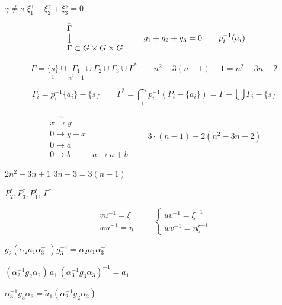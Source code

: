 \documentclass[11pt,a4paper]{article}
\begin{document}
$\gamma \neq s$ \qquad $\xi_1^\gamma + \xi_2^\gamma + \xi_3^\gamma = 0$ \qquad {}

\[
\begin{array}{l}
\tilde\Gamma \\
\big\downarrow \\
\Gamma \subset G \times G \times G
\end{array}
\qquad
g_1 + g_2 + g_3 = 0
\qquad
p_i^{-1}(a_i)
\]

\[
\Gamma = \underset{1}{\lbrace s \rbrace} \cup \underset{n^2 - 1}{\Gamma_1} \cup \Gamma_2 \cup \Gamma_3 \cup \Gamma^{*}
\qquad
n^2 - 3(n-1) - 1 = n^2 - 3n + 2
\]

\[
\Gamma_i = p_i^{-1}\lbrace a_i \rbrace - \lbrace s \rbrace
\qquad
\Gamma^{*} = \bigcap_i p_i^{-1}(P_i - \lbrace a_i \rbrace) = \Gamma - \bigcup \Gamma_i - \lbrace s \rbrace
\]

\[
\begin{array}{ll}
x \xrightarrow{\ \sim\ } y & \\
0 \to y - x & \\
0 \to a & \\
0 \to b & a \to a + b
\end{array}
\qquad
\boxed{3 \cdot (n-1) + 2(n^2 - 3n + 2)}
\]

$2n^2 - 3n + 1$ \qquad $3n - 3 = 3(n - 1)$

$P_2^{*}, P_3^{*}, P_1^{*}$, \quad $\Gamma^{*}$

\[
\begin{array}{l}
v u^{-1} = \xi \\
w u^{-1} = \eta
\end{array}
\qquad
\left\lbrace
\begin{array}{l}
u v^{-1} = \xi^{-1} \\
w v^{-1} = \eta \xi^{-1}
\end{array}
\right.
\]

$g_2 (\alpha_2 a_1 \alpha_3^{-1}) g_3^{-1} = \alpha_2 a_1 \alpha_3^{-1}$

$(\alpha_2^{-1} g_2 \alpha_2)\, a_1\, (\alpha_3^{-1} g_3 \alpha_3)^{-1} = a_1$

\qquad $\alpha_3^{-1} g_3 \alpha_3 = \tilde a_1 (\alpha_2^{-1} g_2 \alpha_2)$
\end{document}

